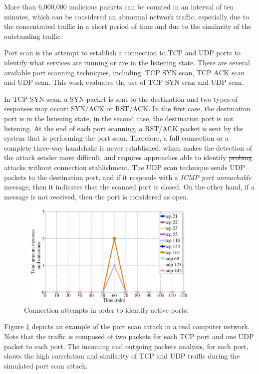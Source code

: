 \documentclass[review]{elsarticle}
\providecommand{\DIFaddtex}[1]{{\protect\color{blue}\uwave{#1}}} %
\providecommand{\DIFdeltex}[1]{{\protect\color{red}\sout{#1}}}                      %
\providecommand{\DIFaddbegin}{} %
\providecommand{\DIFaddend}{} %
\providecommand{\DIFdelbegin}{} %
\providecommand{\DIFdelend}{} %
\providecommand{\DIFadd}[1]{\texorpdfstring{\DIFaddtex{#1}}{#1}} %
\providecommand{\DIFdel}[1]{\texorpdfstring{\DIFdeltex{#1}}{}} %
\begin{document}
More than 6,000,000 malicious packets can be counted in an interval of ten minutes, which can be considered an abnormal network traffic, especially due to the concentrated traffic in a short period of time and due to the similarity of the outstanding traffic.

Port scan is the attempt to establish a connection to TCP and UDP ports to identify what services are running or are in the listening state. There are several available port scanning techniques, including: TCP SYN scan, TCP ACK scan and UDP scan. This work evaluates the use of TCP SYN scan and UDP scan. 

In TCP SYN scan, a SYN packet is sent to the destination and two types of responses may occur: SYN/ACK or RST/ACK. In the first case, the destination port is in the listening state, in the second case, the destination port is not listening. At the end of each port scanning, a RST/ACK packet is sent by the system that is performing the port scan. Therefore, a full connection or a complete three-way handshake is never established, which makes the detection of the attack sender more difficult, and requires approaches able to identify \DIFdelbegin \DIFdel{probing }\DIFdelend \DIFaddbegin \DIFadd{probe }\DIFaddend attacks without connection stablishment. The UDP scan technique sends UDP packets to the destination port, and if it responds with a \emph{ICMP port unreachable} message, then it indicates that the scanned port is closed. On the other hand, if a message is not received, then the port is considered as open.

\begin{figure}[h!]
     \centering 
     \includegraphics[height=5cm, width=9cm]{results/figures/fig07.png}
     \caption{Connection attempts in order to identify active ports.}
     \label{fig:fig7}
\end{figure}

Figure \ref{fig:fig7} depicts an example of the port scan attack in a real computer network. Note that the traffic is composed of two packets for each TCP port and one UDP packet to each port. The incoming and outgoing packets analysis, for each port, shows the high correlation and similarity of TCP and UDP traffic during the simulated port scan attack.
\end{document}
